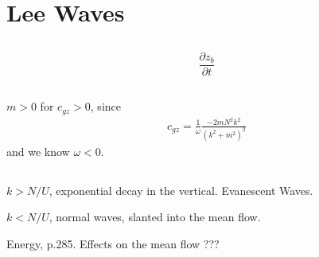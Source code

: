 \documentclass[11pt,letterpaper]{book}
\theoremstyle{definition}
\newcommand{\pe}{\partial}
\begin{document}
\section{Lee Waves}\label{Dec_2010_3}
\subsection{}
$$\frac{\pe z_b}{\pe t}$$

\subsection{}
$m>0$ for $c_{gz}>0$, since
\begin{align*}
    c_{gz} = \frac{1}{\omega}\frac{-2mN^2k^2}{(k^2+m^2)^2}
\end{align*}
and we know $\omega<0$.

\subsection{}
$k>N/U$, exponential decay in the vertical. Evanescent Waves. 

$k<N/U$, normal waves, slanted into the mean flow.

Energy, \cite{vallis} p.285. Effects on the mean flow ???
\end{document}
